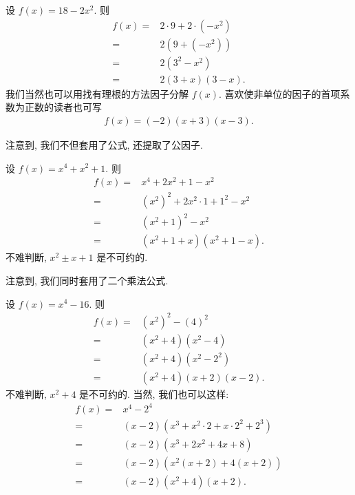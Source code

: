 \begin{example}
    设 $f(x) = 18 - 2x^2$. 则
    \begin{align*}
        f(x)
        = {} & 2 \cdot 9 + 2 \cdot (-x^2) \\
        = {} & 2(9 + (-x^2))              \\
        = {} & 2(3^2 - x^2)               \\
        = {} & 2(3 + x)(3 - x).
    \end{align*}
    我们当然也可以用找有理根的方法因子分解 $f(x)$. 喜欢使非单位的因子的首项系数为正数的读者也可写
    \begin{align*}
        f(x) = (-2) (x + 3) (x - 3).
    \end{align*}

    注意到, 我们不但套用了公式, 还提取了公因子.
\end{example}

\begin{example}
    设 $f(x) = x^4 + x^2 + 1$. 则
    \begin{align*}
        f(x)
        = {} & x^4 + 2x^2 + 1 - x^2               \\
        = {} & (x^2)^2 + 2x^2 \cdot 1 + 1^2 - x^2 \\
        = {} & (x^2 + 1)^2 - x^2                  \\
        = {} & (x^2 + 1 + x) (x^2 + 1 - x).
    \end{align*}
    不难判断, $x^2 \pm x + 1$ 是不可约的.

    注意到, 我们同时套用了二个乘法公式.
\end{example}

\begin{example}
    设 $f(x) = x^4 - 16$. 则
    \begin{align*}
        f(x)
        = {} & (x^2)^2 - (4)^2            \\
        = {} & (x^2 + 4) (x^2 - 4)        \\
        = {} & (x^2 + 4) (x^2 - 2^2)      \\
        = {} & (x^2 + 4) (x + 2) (x - 2).
    \end{align*}
    不难判断, $x^2 + 4$ 是不可约的. 当然, 我们也可以这样:
    \begin{align*}
        f(x)
        = {} & x^4 - 2^4                                       \\
        = {} & (x - 2) (x^3 + x^2 \cdot 2 + x \cdot 2^2 + 2^3) \\
        = {} & (x - 2) (x^3 + 2x^2 + 4x + 8)                   \\
        = {} & (x - 2) (x^2 (x + 2) + 4 (x + 2))               \\
        = {} & (x - 2) (x^2 + 4) (x + 2).
    \end{align*}
\end{example}

